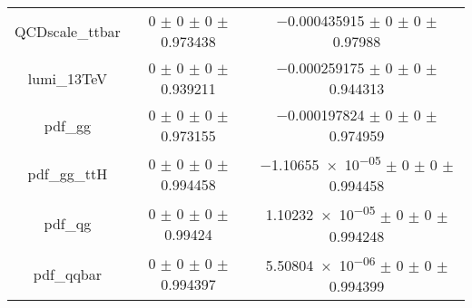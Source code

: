 \begin{table}
\begin{tabular}{ccc}
QCDscale\_ttbar & \num{0} $\pm$ \num{0} $\pm$ \num{0} $\pm$ \num{0.973438} & \num{-0.000435915} $\pm$ \num{0} $\pm$ \num{0} $\pm$ \num{0.97988}\\
lumi\_13TeV & \num{0} $\pm$ \num{0} $\pm$ \num{0} $\pm$ \num{0.939211} & \num{-0.000259175} $\pm$ \num{0} $\pm$ \num{0} $\pm$ \num{0.944313}\\
pdf\_gg & \num{0} $\pm$ \num{0} $\pm$ \num{0} $\pm$ \num{0.973155} & \num{-0.000197824} $\pm$ \num{0} $\pm$ \num{0} $\pm$ \num{0.974959}\\
pdf\_gg\_ttH & \num{0} $\pm$ \num{0} $\pm$ \num{0} $\pm$ \num{0.994458} & \num{-1.10655e-05} $\pm$ \num{0} $\pm$ \num{0} $\pm$ \num{0.994458}\\
pdf\_qg & \num{0} $\pm$ \num{0} $\pm$ \num{0} $\pm$ \num{0.99424} & \num{1.10232e-05} $\pm$ \num{0} $\pm$ \num{0} $\pm$ \num{0.994248}\\
pdf\_qqbar & \num{0} $\pm$ \num{0} $\pm$ \num{0} $\pm$ \num{0.994397} & \num{5.50804e-06} $\pm$ \num{0} $\pm$ \num{0} $\pm$ \num{0.994399}\\
\bottomrule
\end{tabular}
\end{table}